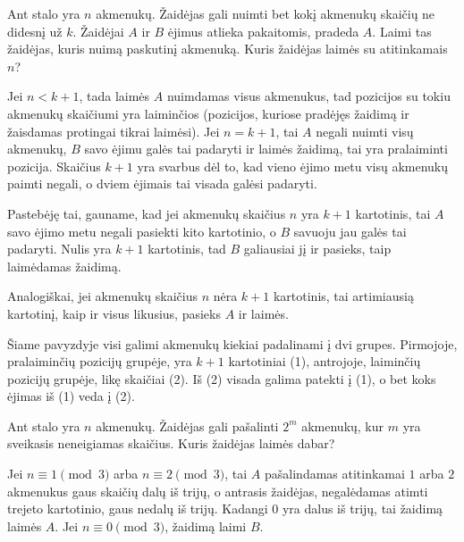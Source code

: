\begin{pavnr}
  Ant stalo yra $n$ akmenukų. Žaidėjas gali nuimti bet kokį akmenukų skaičių
  ne didesnį už $k$. Žaidėjai $A$ ir $B$ ėjimus atlieka pakaitomis, pradeda $A$.
  Laimi tas žaidėjas, kuris nuimą paskutinį akmenuką. Kuris žaidėjas laimės
  su atitinkamais $n$?
  \label{n/kakmenukų}
\end{pavnr}

\begin{sprendimas}
Jei  $n<k+1$, tada laimės $A$ nuimdamas visus akmenukus, tad pozicijos su
tokiu akmenukų skaičiumi yra laiminčios (pozicijos, kuriose pradėjęs
žaidimą ir žaisdamas protingai tikrai laimėsi). Jei $n=k+1$, tai $A$ negali
nuimti visų akmenukų, $B$ savo ėjimu galės tai padaryti ir laimės
žaidimą, tai yra pralaiminti pozicija. Skaičius $k+1$ yra svarbus dėl to,
kad vieno ėjimo metu visų akmenukų paimti negali, o dviem ėjimais tai
visada galėsi padaryti. 

Pastebėję tai, gauname, kad jei akmenukų skaičius $n$ yra $k+1$ kartotinis, tai
$A$ savo ėjimo metu negali pasiekti kito kartotinio, o $B$ savuoju jau
galės tai padaryti.  Nulis yra $k+1$ kartotinis, tad $B$ galiausiai jį ir
pasieks, taip laimėdamas žaidimą. 

Analogiškai, jei akmenukų skaičius $n$ nėra $k+1$ kartotinis, tai
artimiausią kartotinį, kaip ir visus likusius, pasieks $A$ ir laimės.
\end{sprendimas}

Šiame pavyzdyje visi galimi akmenukų kiekiai
padalinami į dvi grupes. Pirmojoje, pralaiminčių pozicijų grupėje, yra $k+1$ kartotiniai (1),
antrojoje, laiminčių pozicijų grupėje, likę skaičiai (2). Iš (2) visada galima patekti į (1), o bet
koks ėjimas iš (1) veda į (2). 

\begin{pavnr}
  Ant stalo yra $n$ akmenukų. Žaidėjas gali pašalinti $2^{m}$ akmenukų, kur
  $m$ yra sveikasis neneigiamas skaičius. Kuris žaidėjas laimės dabar?
\end{pavnr}

\begin{sprendimas}
  Jei $n \equiv 1 \pmod{3}$ arba $n \equiv 2 \pmod{3}$, tai $A$ pašalindamas
  atitinkamai $1$ arba $2$ akmenukus gaus skaičių dalų iš trijų, o antrasis
  žaidėjas, negalėdamas atimti trejeto kartotinio, gaus nedalų iš trijų.
  Kadangi $0$ yra dalus iš trijų, tai žaidimą laimės $A$. Jei $n \equiv 0
  \pmod{3}$, žaidimą laimi $B$.
\end{sprendimas}

